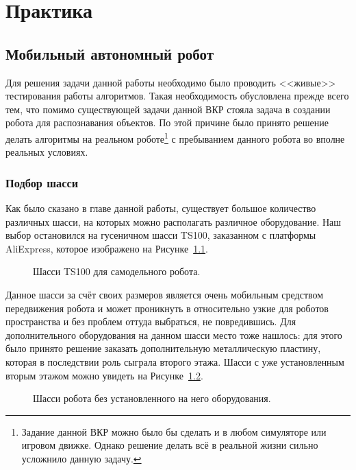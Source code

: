 \chapter{Практика}\label{ch:ch3}

\section{Мобильный автономный робот}
Для решения задачи данной работы необходимо было проводить <<живые>> тестирования работы алгоритмов. Такая необходимость обусловлена прежде всего тем, что помимо существующей задачи данной ВКР стояла задача в создании робота для распознавания объектов. По этой причине было принято решение делать алгоритмы на реальном роботе\footnote{Задание данной ВКР можно было бы сделать и в любом симуляторе или игровом движке. Однако решение делать всё в реальной жизни сильно усложнило данную задачу.} с пребыванием данного робота во вполне реальных условиях.

\subsection{Подбор шасси}
Как было сказано в  главе данной работы, существует большое количество различных шасси, на которых можно располагать различное оборудование. Наш выбор остановился на гусеничном шасси TS100, заказанном с платформы AliExpress, которое изображено на Рисунке~\ref{fig:ts100}.

\begin{figure}[ht]
  \centerfloat{
    \texttt{[image: ts100]}
  }
  \caption{Шасси TS100 для самодельного робота.}\label{fig:ts100}
\end{figure}

Данное шасси за счёт своих размеров является очень мобильным средством передвижения робота и может проникнуть в относительно узкие для роботов пространства и без проблем оттуда выбраться, не повредившись. Для дополнительного оборудования на данном шасси место тоже нашлось: для этого было принято решение заказать дополнительную металлическую пластину, которая в последствии роль сыграла второго этажа. Шасси с уже установленным вторым этажом можно увидеть на Рисунке~\ref{fig:robot-empty}.

\begin{figure}[ht]
  \caption{Шасси робота без установленного на него оборудования.}\label{fig:robot-empty}
\end{figure}

